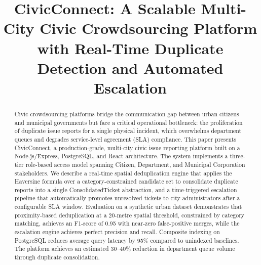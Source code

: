 \documentclass[conference]{IEEEtran}
\begin{document}
\title{CivicConnect: A Scalable Multi-City Civic Crowdsourcing Platform with Real-Time Duplicate Detection and Automated Escalation}

\author{
\and
{}
}

\maketitle

\begin{abstract}
Civic crowdsourcing platforms bridge the communication gap between urban citizens and municipal governments but face a critical operational bottleneck: the proliferation of duplicate issue reports for a single physical incident, which overwhelms department queues and degrades service-level agreement (SLA) compliance. This paper presents CivicConnect, a production-grade, multi-city civic issue reporting platform built on a Node.js/Express, PostgreSQL, and React architecture. The system implements a three-tier role-based access model spanning Citizen, Department, and Municipal Corporation stakeholders. We describe a real-time spatial deduplication engine that applies the Haversine formula over a category-constrained candidate set to consolidate duplicate reports into a single ConsolidatedTicket abstraction, and a time-triggered escalation pipeline that automatically promotes unresolved tickets to city administrators after a configurable SLA window. Evaluation on a synthetic urban dataset demonstrates that proximity-based deduplication at a 20-metre spatial threshold, constrained by category matching, achieves an F1-score of 0.95 with near-zero false-positive merges, while the escalation engine achieves perfect precision and recall. Composite indexing on PostgreSQL reduces average query latency by 95\% compared to unindexed baselines. The platform achieves an estimated 30--40\% reduction in department queue volume through duplicate consolidation.
\end{abstract}
\end{document}
